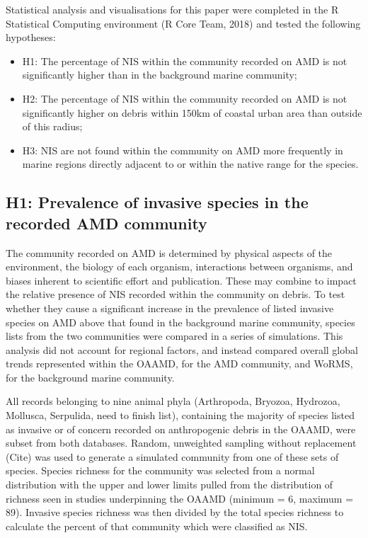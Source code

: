 \documentclass[a4paper, nobind]{templates/ociamthesis}
\providecommand{\tightlist}{%
  \setlength{\itemsep}{0pt}\setlength{\parskip}{0pt}}
\begin{document}
Statistical analysis and visualisations for this paper were completed in the R Statistical Computing environment (R Core Team, 2018) and tested the following hypotheses:

\begin{itemize}
\tightlist
\item
  H1: The percentage of NIS within the community recorded on AMD is not significantly higher than in the background marine community;
\item
  H2: The percentage of NIS within the community recorded on AMD is not significantly higher on debris within 150km of coastal urban area than outside of this radius;
\item
  H3: NIS are not found within the community on AMD more frequently in marine regions directly adjacent to or within the native range for the species.
\end{itemize}

\hypertarget{h1-prevalence-of-invasive-species-in-the-recorded-amd-community}{%
\subsection{H1: Prevalence of invasive species in the recorded AMD community}\label{h1-prevalence-of-invasive-species-in-the-recorded-amd-community}}

The community recorded on AMD is determined by physical aspects of the environment, the biology of each organism, interactions between organisms, and biases inherent to scientific effort and publication. These may combine to impact the relative presence of NIS recorded within the community on debris. To test whether they cause a significant increase in the prevalence of listed invasive species on AMD above that found in the background marine community, species lists from the two communities were compared in a series of simulations. This analysis did not account for regional factors, and instead compared overall global trends represented within the OAAMD, for the AMD community, and WoRMS, for the background marine community.

All records belonging to nine animal phyla (Arthropoda, Bryozoa, Hydrozoa, Mollusca, Serpulida, need to finish list), containing the majority of species listed as invasive or of concern recorded on anthropogenic debris in the OAAMD, were subset from both databases. Random, unweighted sampling without replacement (Cite) was used to generate a simulated community from one of these sets of species. Species richness for the community was selected from a normal distribution with the upper and lower limits pulled from the distribution of richness seen in studies underpinning the OAAMD (minimum = 6, maximum = 89). Invasive species richness was then divided by the total species richness to calculate the percent of that community which were classified as NIS.
\end{document}
